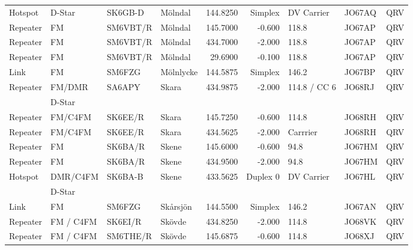 \begin{landscape}
\begin{longtable}{llllrrlll}
Hotspot  & D-Star    & SK6GB-D  & Mölndal           & 144.8250     & Simplex    & DV Carrier   & JO67AQ      & QRV      \\
Repeater & FM        & SM6VBT/R & Mölndal           & 145.7000     & -0.600     & 118.8        & JO67AP      & QRV      \\
Repeater & FM        & SM6VBT/R & Mölndal           & 434.7000     & -2.000     & 118.8        & JO67AP      & QRV      \\
Repeater & FM        & SM6VBT/R & Mölndal           & 29.6900      & -0.100     & 118.8        & JO67AP      & QRV      \\
Link     & FM        & SM6FZG   & Mölnlycke         & 144.5875     & Simplex    & 146.2        & JO67BP      & QRV      \\
Repeater & FM/DMR    & SA6APY   & Skara             & 434.9875     & -2.000     & 114.8 / CC 6 & JO68RJ      & QRV      \\
         & D-Star    &          &                   &              &            &              &             &          \\
Repeater & FM/C4FM   & SK6EE/R  & Skara             & 145.7250     & -0.600     & 114.8        & JO68RH      & QRV      \\
Repeater & FM/C4FM   & SK6EE/R  & Skara             & 434.5625     & -2.000     & Carrrier     & JO68RH      & QRV      \\
Repeater & FM        & SK6BA/R  & Skene             & 145.6000     & -0.600     & 94.8         & JO67HM      & QRV      \\
Repeater & FM        & SK6BA/R  & Skene             & 434.9500     & -2.000     & 94.8         & JO67HM      & QRV      \\
Hotspot  & DMR/C4FM  & SK6BA-B  & Skene             & 433.5625     & Duplex 0   & DV Carrier   & JO67HL      & QRV      \\
         & D-Star    &          &                   &              &            &              &             &          \\
Link     & FM        & SM6FZG   & Skårsjön          & 144.5500     & Simplex    & 146.2        & JO67AN      & QRV      \\
Repeater & FM / C4FM & SK6EI/R  & Skövde            & 434.8250     & -2.000     & 114.8        & JO68VK      & QRV      \\
Repeater & FM / C4FM & SM6THE/R & Skövde            & 145.6875     & -0.600     & 114.8        & JO68XJ      & QRV      \\

\end{longtable}
\end{landscape}
